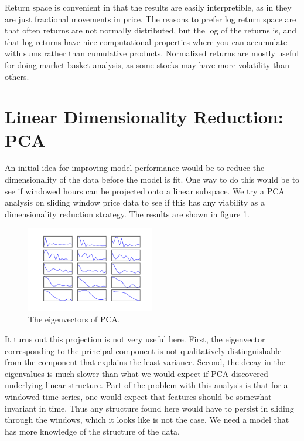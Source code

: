 \documentclass{article}
\begin{document}
Return space is convenient in that the results are easily interpretible, as in they are
just fractional movements in price. The reasons to prefer log return space are that
often returns are not normally distributed, but the log of the returns is, and that
log returns have nice computational properties where you can accumulate with sums
rather than cumulative products. Normalized returns are mostly useful for doing
market basket analysis, as some stocks may have more volatility than others. 

\section{Linear Dimensionality Reduction: PCA}

An initial idea for improving model performance would be to reduce the dimensionality
of the data before the model is fit. One way to do this would be to 
see if windowed hours can be projected onto a linear subspace.
We try a PCA analysis on sliding window price data to see if this
has any viability as a dimensionality reduction strategy. The results are shown
in figure \ref{fig:pca}. 

\begin{figure}[h]
    \includegraphics[width=0.5\textwidth]{pca_features}
    \caption{The eigenvectors of PCA.}
    \label{fig:pca}
\end{figure}

It turns out this projection is not
very useful here. First, the eigenvector corresponding to the
principal component is not qualitatively distinguishable from
the component that explains the least variance. Second, the
decay in the eigenvalues is much slower than what we would
expect if PCA discovered underlying linear structure. Part of
the problem with this analysis is that for a windowed time series,
one would expect that features should be somewhat invariant in
time. Thus any structure found here would have to persist in sliding
through the windows, which it looks like is not the case. We need
a model that has more knowledge of the structure of the data. 
\end{document}
